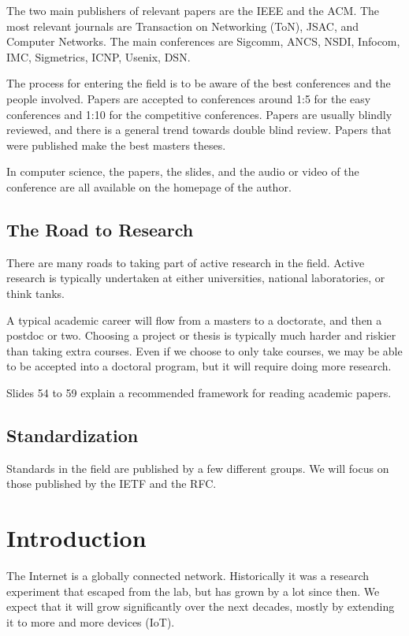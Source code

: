 \documentclass{idc_msc}
\begin{document}
The two main publishers of relevant papers are the IEEE and the ACM.
The most relevant journals are Transaction on Networking (ToN), JSAC, and Computer Networks.
The main conferences are Sigcomm, ANCS, NSDI, Infocom, IMC, Sigmetrics, ICNP, Usenix, DSN.

The process for entering the field is to be aware of the best conferences and the people involved.
Papers are accepted to conferences around 1:5 for the easy conferences and 1:10 for the competitive conferences.
Papers are usually blindly reviewed, and there is a general trend towards double blind review.
Papers that were published make the best masters theses.

In computer science, the papers, the slides, and the audio or video of the conference are all available on the homepage of the author.

\subsection{The Road to Research}

There are many roads to taking part of active research in the field.
Active research is typically undertaken at either universities, national laboratories, or think tanks.

A typical academic career will flow from a masters to a doctorate, and then a postdoc or two.
Choosing a project or thesis is typically much harder and riskier than taking extra courses.
Even if we choose to only take courses, we may be able to be accepted into a doctoral program, but it will require doing more research.

Slides 54 to 59 explain a recommended framework for reading academic papers.

\subsection{Standardization}

Standards in the field are published by a few different groups.
We will focus on those published by the IETF and the RFC.

\section{Introduction}

The Internet is a globally connected network.
Historically it was a research experiment that escaped from the lab, but has grown by a lot since then.
We expect that it will grow significantly over the next decades, mostly by extending it to more and more devices (IoT).
\end{document}
